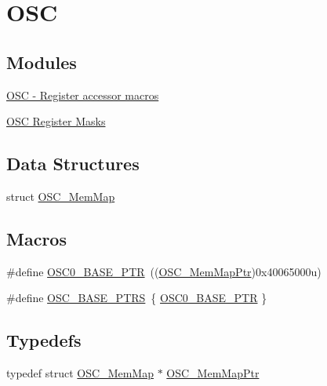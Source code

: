 \hypertarget{group___o_s_c___peripheral}{}\section{O\+S\+C}
\label{group___o_s_c___peripheral}
\subsection*{Modules}
\begin{DoxyCompactItemize}
\item 
\hyperlink{group___o_s_c___register___accessor___macros}{O\+S\+C -\/ Register accessor macros}
\item 
\hyperlink{group___o_s_c___register___masks}{O\+S\+C Register Masks}
\end{DoxyCompactItemize}
\subsection*{Data Structures}
\begin{DoxyCompactItemize}
\item 
struct \hyperlink{struct_o_s_c___mem_map}{O\+S\+C\+\_\+\+Mem\+Map}
\end{DoxyCompactItemize}
\subsection*{Macros}
\begin{DoxyCompactItemize}
\item 
\#define \hyperlink{group___o_s_c___peripheral_gaab1618c69a91b2e5d3385139b5b566f0}{O\+S\+C0\+\_\+\+B\+A\+S\+E\+\_\+\+P\+T\+R}~((\hyperlink{group___o_s_c___peripheral_gaaa685163f549fdf24c28ec9b400310b5}{O\+S\+C\+\_\+\+Mem\+Map\+Ptr})0x40065000u)
\item 
\#define \hyperlink{group___o_s_c___peripheral_ga46f69fcb9d660e18b5cbf51adbbcec78}{O\+S\+C\+\_\+\+B\+A\+S\+E\+\_\+\+P\+T\+R\+S}~\{ \hyperlink{group___o_s_c___peripheral_gaab1618c69a91b2e5d3385139b5b566f0}{O\+S\+C0\+\_\+\+B\+A\+S\+E\+\_\+\+P\+T\+R} \}
\end{DoxyCompactItemize}
\subsection*{Typedefs}
\begin{DoxyCompactItemize}
\item 
typedef struct \hyperlink{struct_o_s_c___mem_map}{O\+S\+C\+\_\+\+Mem\+Map} $\ast$ \hyperlink{group___o_s_c___peripheral_gaaa685163f549fdf24c28ec9b400310b5}{O\+S\+C\+\_\+\+Mem\+Map\+Ptr}
\end{DoxyCompactItemize}


